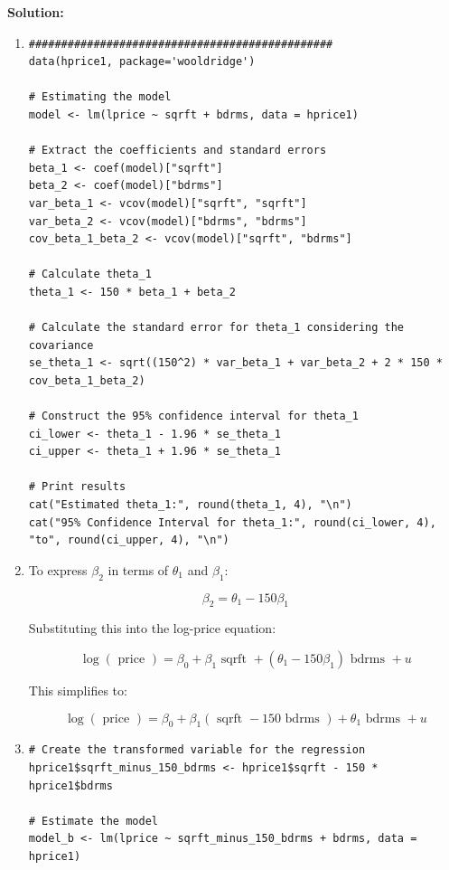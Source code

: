 \documentclass[12pt]{article}
\begin{document}
\begin{enumerate}
{\color{blue}
\noindent \textbf{Solution:}

\begin{enumerate}
    \item 
\begin{verbatim}
###############################################
data(hprice1, package='wooldridge')

# Estimating the model
model <- lm(lprice ~ sqrft + bdrms, data = hprice1)

# Extract the coefficients and standard errors
beta_1 <- coef(model)["sqrft"]
beta_2 <- coef(model)["bdrms"]
var_beta_1 <- vcov(model)["sqrft", "sqrft"]
var_beta_2 <- vcov(model)["bdrms", "bdrms"]
cov_beta_1_beta_2 <- vcov(model)["sqrft", "bdrms"]

# Calculate theta_1
theta_1 <- 150 * beta_1 + beta_2

# Calculate the standard error for theta_1 considering the covariance
se_theta_1 <- sqrt((150^2) * var_beta_1 + var_beta_2 + 2 * 150 * cov_beta_1_beta_2)

# Construct the 95% confidence interval for theta_1
ci_lower <- theta_1 - 1.96 * se_theta_1
ci_upper <- theta_1 + 1.96 * se_theta_1

# Print results
cat("Estimated theta_1:", round(theta_1, 4), "\n")
cat("95% Confidence Interval for theta_1:", round(ci_lower, 4), "to", round(ci_upper, 4), "\n")

\end{verbatim}

\item To express $\beta_2$ in terms of $\theta_1$ and $\beta_1$:

\[
\beta_2 = \theta_1 - 150\beta_1
\]

Substituting this into the log-price equation:

\[
\log (\text { price }) = \beta_0 + \beta_1 \text { sqrft } + (\theta_1 - 150\beta_1) \text { bdrms } + u
\]

This simplifies to:

\[
\log (\text { price }) = \beta_0 + \beta_1 (\text { sqrft } - 150 \text { bdrms }) + \theta_1 \text { bdrms } + u
\]

\item 
\begin{verbatim}
# Create the transformed variable for the regression
hprice1$sqrft_minus_150_bdrms <- hprice1$sqrft - 150 * hprice1$bdrms

# Estimate the model
model_b <- lm(lprice ~ sqrft_minus_150_bdrms + bdrms, data = hprice1)


\end{verbatim}
\end{enumerate}}
\end{enumerate}
\end{document}
